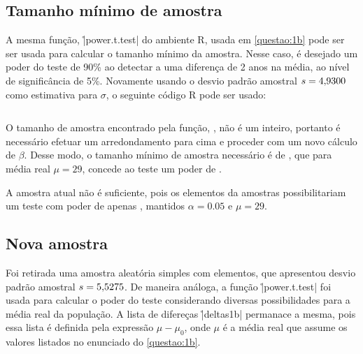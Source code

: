 \inputminted{r}{questao1/b.R}




\subsection{Tamanho mínimo de amostra}
\label{questao:1c}

A mesma função, \r|power.t.test| do ambiente R, usada em \autoref{questao:1b} pode ser ser usada para calcular o tamanho mínimo da amostra. Nesse caso, é desejado um poder do teste de 90\% ao detectar a uma diferença de 2 anos na média, ao nível de significância de 5\%. Novamente usando o desvio padrão amostral $s = \num{4.9300}$ como estimativa para $\sigma$, o seguinte código R pode ser usado:

\inputminted{r}{questao1/c.R}

O tamanho de amostra encontrado pela função, \UMCn, não é um inteiro, portanto é necessário efetuar um arredondamento para cima e proceder com um novo cálculo de $\beta$. Desse modo, o tamanho mínimo de amostra necessário é de \UMCnMin, que para média real $\mu = 29$, concede ao teste um poder de \UMCbeta.

A amostra atual não é suficiente, pois os \UMAn elementos da amostras possibilitariam um teste com poder de apenas \UMCbetaOld, mantidos $\alpha = 0.05$ e $\mu = 29$.

\subsection{Nova amostra}
\label{questao:1d}

Foi retirada uma amostra aleatória simples com \UMCnMin elementos, que apresentou desvio padrão amostral $s = \num{5.5275}$. De maneira análoga, a função \r|power.t.test| foi usada para calcular o poder do teste considerando diversas possibilidades para a média real da população. A lista de difereças \r|deltas1b|  permanace a mesma, pois essa lista é definida pela expressão $\mu - \mu_0$, onde $\mu$ é a média real que assume os valores listados no enunciado do \autoref{questao:1b}.

